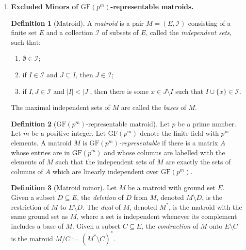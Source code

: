 \documentclass[12pt]{article}
\numberwithin{equation}{section}
\theoremstyle{definition}
\newtheorem{definition}{Definition}
\newtheorem{conjecture}[theorem]{Conjecture}
\newcommand{\ev}[1]{( #1 )}
\begin{document}
\begin{enumerate}
\begin{conjecture}[Hadwiger's Conjecture
\mbox{\cite[Conjecture 1]{steiner}}]\label{hadw}
Let $r\in \mathbb{N}$.
For every finite simple graph $G$, we have:
$$
r \leq \chi\ev{G} \ \Longrightarrow \  r \leq h\ev{G} 
$$
where $\chi\ev{G}$ denotes the chromatic number of $G$. 
\end{conjecture}

While Conjecture \ref{hadw} is not difficult for values of $r\leq 3$, already for $r=4$ it is equivalent to the 4-colour theorem. 
Robertson, Seymour and Thomas proved the above for $r= 5$ \cite{RobertsonSeymourThomas1993Hadwiger}. 

\newpage
\item \textbf{Excluded Minors of $\mathrm{GF}(p^m)$-representable matroids.}

\begin{definition}[Matroid]
A \emph{matroid} is a pair $M=(E,\mathcal I)$ consisting of a finite set $E$ and a collection $\mathcal I$ of subsets of $E$, called the \emph{independent sets}, such that:
\begin{enumerate}
\item $\emptyset \in \mathcal I$;
\item if $I\in \mathcal I$ and $J\subseteq I$, then $J\in \mathcal I$;
\item if $I,J\in \mathcal I$ and $|I|<|J|$, then there is some $x\in J\setminus I$ such that $I\cup \{x\}\in \mathcal I$.
\end{enumerate}
The maximal independent sets of $M$ are called the \emph{bases} of $M$.
\end{definition}

\begin{definition}[$\mathrm{GF}(p^m)$-representable matroid]
Let $p$ be a prime number. Let $m$ be a positive integer. Let $\mathrm{GF}(p^m)$ denote the finite field with $p^m$ elements. A matroid $M$ is \emph{$\mathrm{GF}(p^m)$-representable} if there is a matrix $A$  whose entries are in $\mathrm{GF}(p^m)$ and whose columns are labelled with the elements of $M$ such that the independent sets of $M$ are exactly the sets of columns of $A$ which are linearly independent over $\mathrm{GF}(p^m)$.
\end{definition}

\begin{definition}[Matroid minor]
Let $M$ be a matroid with ground set $E$. 
Given a subset $D \subseteq E$, the \emph{deletion} of $D$ from $M$, denoted $M\setminus D$, is the restriction of $M$ to $E\setminus D$.
The \textit{dual} of $M$, denoted $M^*$, is the matroid with the same ground set as $M$, where a set is independent whenever its complement includes a base of $M$.  Given a subset $C\subseteq E$, the \emph{contraction} of $M$ onto $E\setminus C$ is the matroid $M/C := (M^* \setminus C)^*$.


\end{definition}
\end{enumerate}
\end{document}
